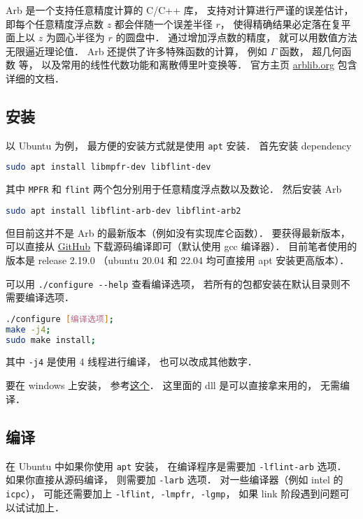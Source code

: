 

Arb 是一个支持任意精度计算的 C/C++ 库， 支持对计算进行严谨的误差估计， 即每个任意精度浮点数 $z$ 都会伴随一个误差半径 $r$， 使得精确结果必定落在复平面上以 $z$ 为圆心半径为 $r$ 的圆盘中． 通过增加浮点数的精度， 就可以用数值方法无限逼近理论值． Arb 还提供了许多特殊函数的计算， 例如 $\Gamma$ 函数， 超几何函数 等， 以及常用的线性代数功能和离散傅里叶变换等． 官方主页 \href{https://arblib.org/}{arblib.org} 包含详细的文档．

\subsection{安装}
以 Ubuntu 为例， 最方便的安装方式就是使用 \verb|apt| 安装． 首先安装 dependency
\begin{lstlisting}[language=bash]
sudo apt install libmpfr-dev libflint-dev
\end{lstlisting}
其中 \verb|MPFR| 和 \verb|flint| 两个包分别用于任意精度浮点数以及数论． 然后安装 Arb
\begin{lstlisting}[language=bash]
sudo apt install libflint-arb-dev libflint-arb2
\end{lstlisting}

但目前这并不是 Arb 的最新版本（例如没有实现库仑函数）． 要获得最新版本， 可以直接从 \href{https://github.com/fredrik-johansson/arb/}{GitHub} 下载源码编译即可（默认使用 gcc 编译器）． 目前笔者使用的版本是 release 2.19.0 （ubuntu 20.04 和 22.04 均可直接用 apt 安装更高版本）．

可以用 \verb|./configure --help| 查看编译选项， 若所有的包都安装在默认目录则不需要编译选项．
\begin{lstlisting}[language=bash]
./configure [编译选项];
make -j4;
sudo make install;
\end{lstlisting}
其中 \verb|-j4| 是使用 4 线程进行编译， 也可以改成其他数字．

要在 windows 上安装， 参考\href{https://github.com/ahrvoje/arb4win}{这个}． 这里面的 dll 是可以直接拿来用的， 无需编译．

\subsection{编译}
在 Ubuntu 中如果你使用 \verb|apt| 安装， 在编译程序是需要加 \verb|-lflint-arb| 选项． 如果你直接从源码编译， 则需要加 \verb|-larb| 选项． 对一些编译器（例如 intel 的 \verb|icpc|）， 可能还需要加上 \verb|-lflint, -lmpfr, -lgmp|， 如果 link 阶段遇到问题可以试试加上．

